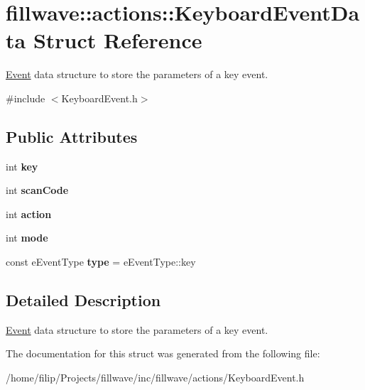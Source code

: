 \hypertarget{structfillwave_1_1actions_1_1KeyboardEventData}{}\section{fillwave\+:\+:actions\+:\+:Keyboard\+Event\+Data Struct Reference}
\label{structfillwave_1_1actions_1_1KeyboardEventData}


\hyperlink{classfillwave_1_1actions_1_1Event}{Event} data structure to store the parameters of a key event.  




{\ttfamily \#include $<$Keyboard\+Event.\+h$>$}

\subsection*{Public Attributes}
\begin{DoxyCompactItemize}
\item 
\hypertarget{structfillwave_1_1actions_1_1KeyboardEventData_a8d9037dadc8c0d7c8b87f70c11959edc}{}int {\bfseries key}\label{structfillwave_1_1actions_1_1KeyboardEventData_a8d9037dadc8c0d7c8b87f70c11959edc}

\item 
\hypertarget{structfillwave_1_1actions_1_1KeyboardEventData_a2d86b8e3f90bafecce1d88e77f7bdfa9}{}int {\bfseries scan\+Code}\label{structfillwave_1_1actions_1_1KeyboardEventData_a2d86b8e3f90bafecce1d88e77f7bdfa9}

\item 
\hypertarget{structfillwave_1_1actions_1_1KeyboardEventData_acb22843a4b01911213a7acadc83a0181}{}int {\bfseries action}\label{structfillwave_1_1actions_1_1KeyboardEventData_acb22843a4b01911213a7acadc83a0181}

\item 
\hypertarget{structfillwave_1_1actions_1_1KeyboardEventData_a2e21c4f49415448ee5a5728026a2ddad}{}int {\bfseries mode}\label{structfillwave_1_1actions_1_1KeyboardEventData_a2e21c4f49415448ee5a5728026a2ddad}

\item 
\hypertarget{structfillwave_1_1actions_1_1KeyboardEventData_a71a6733e96b01688a12e4f5912587747}{}const e\+Event\+Type {\bfseries type} = e\+Event\+Type\+::key\label{structfillwave_1_1actions_1_1KeyboardEventData_a71a6733e96b01688a12e4f5912587747}

\end{DoxyCompactItemize}


\subsection{Detailed Description}
\hyperlink{classfillwave_1_1actions_1_1Event}{Event} data structure to store the parameters of a key event. 

The documentation for this struct was generated from the following file\+:\begin{DoxyCompactItemize}
\item 
/home/filip/\+Projects/fillwave/inc/fillwave/actions/Keyboard\+Event.\+h\end{DoxyCompactItemize}
